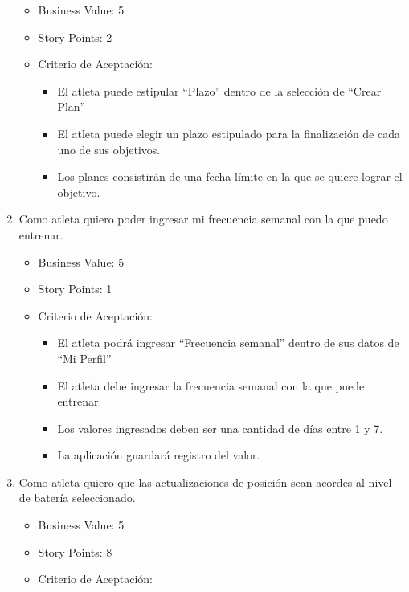\begin{enumerate}
  \begin{itemize}
  \itemsep1pt\parskip0pt
  \item
    Business Value: 5
  \item
    Story Points: 2
  \item
    Criterio de Aceptación:

    \begin{itemize}
    \itemsep1pt\parskip0pt
    \item
      El atleta puede estipular ``Plazo'' dentro de la selección de
      ``Crear Plan''
    \item
      El atleta puede elegir un plazo estipulado para la finalización de
      cada uno de sus objetivos.
    \item
      Los planes consistirán de una fecha límite en la que se quiere
      lograr el objetivo.
    \end{itemize}
  \end{itemize}
\item
  Como atleta quiero poder ingresar mi frecuencia semanal con la que
  puedo entrenar.

  \begin{itemize}
  \itemsep1pt\parskip0pt
  \item
    Business Value: 5
  \item
    Story Points: 1
  \item
    Criterio de Aceptación:

    \begin{itemize}
    \itemsep1pt\parskip0pt
    \item
      El atleta podrá ingresar ``Frecuencia semanal'' dentro de sus
      datos de ``Mi Perfil''
    \item
      El atleta debe ingresar la frecuencia semanal con la que puede
      entrenar.
    \item
      Los valores ingresados deben ser una cantidad de días entre 1 y 7.
    \item
      La aplicación guardará registro del valor.
    \end{itemize}
  \end{itemize}
\item
  Como atleta quiero que las actualizaciones de posición sean acordes al
  nivel de batería seleccionado.

  \begin{itemize}
  \itemsep1pt\parskip0pt
  \item
    Business Value: 5
  \item
    Story Points: 8
  \item
    Criterio de Aceptación:


\end{itemize}
\end{enumerate}

